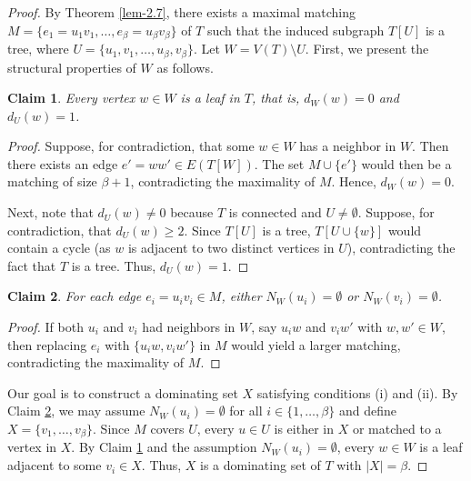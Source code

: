 \documentclass[12pt]{amsart}
\newtheorem{claim}{Claim}[section]
\begin{document}
\begin{proof}
By Theorem \ref{lem-2.7}, there exists a maximal matching \(M = \{e_1 = u_1v_1, \ldots, e_\beta = u_\beta v_\beta\}\) of \(T\) such that the induced subgraph \(T[U]\) is a tree, where \(U = \{u_1, v_1, \ldots, u_\beta, v_\beta\}\). Let \(W = V(T) \setminus U\). First, we present the structural properties of \(W\) as follows.

\begin{claim}\label{claim:W-structure}
Every vertex \(w \in W\) is a leaf in \(T\), that is, \(d_W(w) = 0\) and \(d_U(w) = 1\).
\end{claim}

\begin{proof}
Suppose, for contradiction, that some \(w \in W\) has a neighbor in \(W\). Then there exists an edge \(e' = ww' \in E(T[W])\). The set \(M \cup \{e'\}\) would then be a matching of size \(\beta + 1\), contradicting the maximality of \(M\). Hence, \(d_W(w) = 0\).

Next, note that \(d_U(w) \neq 0\) because \(T\) is connected and \(U \neq \emptyset\). Suppose, for contradiction, that \(d_U(w) \geq 2\). Since \(T[U]\) is a tree, \(T[U \cup \{w\}]\) would contain a cycle (as \(w\) is adjacent to two distinct vertices in \(U\)), contradicting the fact that \(T\) is a tree. Thus, \(d_U(w) = 1\).
\end{proof}

\begin{claim}\label{claim:neighbor-empty}
For each edge \(e_i = u_iv_i \in M\), either \(N_W(u_i) = \emptyset\) or \(N_W(v_i) = \emptyset\).
\end{claim}

\begin{proof}
If both \(u_i\) and \(v_i\) had neighbors in \(W\), say \(u_iw\) and \(v_iw'\) with \(w, w' \in W\), then replacing \(e_i\) with \(\{u_iw, v_iw'\}\) in \(M\) would yield a larger matching, contradicting the maximality of \(M\).
\end{proof}

Our goal is to construct a dominating set \(X\) satisfying conditions (i) and (ii). By Claim \ref{claim:neighbor-empty}, we may assume \(N_W(u_i) = \emptyset\) for all \(i \in \{1, \ldots, \beta\}\) and define \(X = \{v_1, \ldots, v_\beta\}\). Since \(M\) covers \(U\), every \(u \in U\) is either in \(X\) or matched to a vertex in \(X\). By Claim \ref{claim:W-structure} and the assumption \(N_W(u_i) = \emptyset\), every \(w \in W\) is a leaf adjacent to some \(v_i \in X\). Thus, \(X\) is a dominating set of \(T\) with \(|X| = \beta\).


\end{proof}
\end{document}
